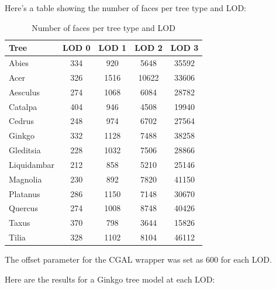 \documentclass[12pt]{article}
\begin{document}
Here's a table showing the number of faces per tree type and LOD:

\begin{table}[h]
    \centering
    \begin{tabular}{|l|c|c|c|c|}
    \hline
    Tree & LOD 0 & LOD 1 & LOD 2 & LOD 3 \\
    \hline
    Abies & 334 & 920 & 5648 & 35592 \\
    Acer & 326 & 1516 & 10622 & 33606 \\
    Aesculus & 274 & 1068 & 6084 & 28782 \\
    Catalpa & 404 & 946 & 4508 & 19940 \\
    Cedrus & 248 & 974 & 6702 & 27564 \\
    Ginkgo & 332 & 1128 & 7488 & 38258 \\
    Gleditsia & 228 & 1032 & 7506 & 28866 \\
    Liquidambar & 212 & 858 & 5210 & 25146 \\
    Magnolia & 230 & 892 & 7820 & 41150 \\
    Platanus & 286 & 1150 & 7148 & 30670 \\
    Quercus & 274 & 1008 & 8748 & 40426 \\
    Taxus & 370 & 798 & 3644 & 15826 \\
    Tilia & 328 & 1102 & 8104 & 46112 \\
    \hline
    \end{tabular}
    \caption{Number of faces per tree type and LOD}
    \label{tab:my_label}
\end{table}

The offset parameter for the CGAL wrapper was set as 600 for each LOD.

Here are the results for a Ginkgo tree model at each LOD:
\end{document}
